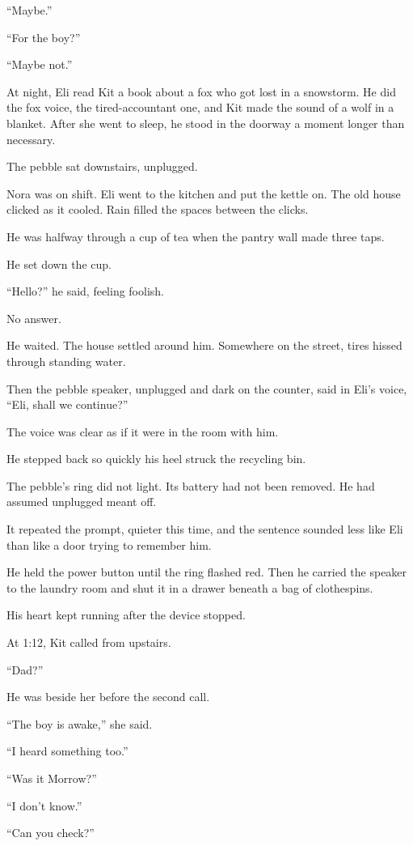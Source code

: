 \documentclass[11pt,openany]{book}
\begin{document}
``Maybe.''

``For the boy?''

``Maybe not.''

At night, Eli read Kit a book about a fox who got lost in a snowstorm. He did the fox voice, the tired-accountant one, and Kit made the sound of a wolf in a blanket. After she went to sleep, he stood in the doorway a moment longer than necessary.

The pebble sat downstairs, unplugged.

Nora was on shift. Eli went to the kitchen and put the kettle on. The old house clicked as it cooled. Rain filled the spaces between the clicks.

He was halfway through a cup of tea when the pantry wall made three taps.

He set down the cup.

``Hello?'' he said, feeling foolish.

No answer.

He waited. The house settled around him. Somewhere on the street, tires hissed through standing water.

Then the pebble speaker, unplugged and dark on the counter, said in Eli's voice, ``Eli, shall we continue?''

The voice was clear as if it were in the room with him.

He stepped back so quickly his heel struck the recycling bin.

The pebble's ring did not light. Its battery had not been removed. He had assumed unplugged meant off.

It repeated the prompt, quieter this time, and the sentence sounded less like Eli than like a door trying to remember him.

He held the power button until the ring flashed red. Then he carried the speaker to the laundry room and shut it in a drawer beneath a bag of clothespins.

His heart kept running after the device stopped.

At 1:12, Kit called from upstairs.

``Dad?''

He was beside her before the second call.

``The boy is awake,'' she said.

``I heard something too.''

``Was it Morrow?''

``I don't know.''

``Can you check?''
\end{document}
